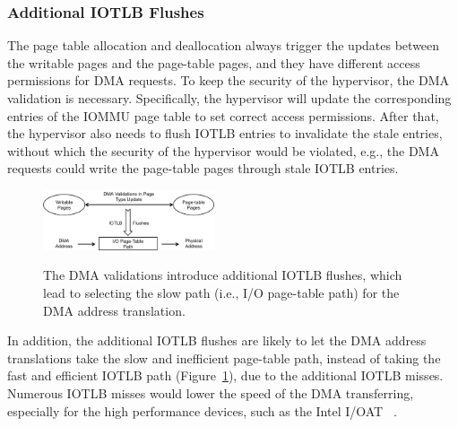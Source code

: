 \subsubsection{Additional IOTLB Flushes}
The page table allocation and deallocation always trigger the updates between the writable pages and the page-table pages, and they have different access permissions for DMA requests.
To keep the security of the hypervisor, the DMA validation is necessary.
Specifically, the hypervisor will update the corresponding entries of the IOMMU page table to set correct access permissions.
After that, the hypervisor also needs to flush IOTLB entries to invalidate the stale entries, without which the security of the hypervisor would be violated, e.g., the DMA requests could write the page-table pages through stale IOTLB entries.

\begin{figure}[ht]
\centering
\includegraphics[width=0.45\textwidth]{image/background/problem-illustration.png} \\
\caption{The DMA validations introduce additional IOTLB flushes, which lead to selecting the slow path  (i.e., I/O page-table path) for the DMA address translation.}
\label{fig:pro-ill}
\end{figure}


In addition, the additional IOTLB flushes are likely to let the DMA address
translations take the slow and inefficient page-table path,
instead of taking the fast and efficient IOTLB path (Figure~\ref{fig:pro-ill}), due to the additional IOTLB misses.
Numerous IOTLB misses would lower the speed of the DMA transferring, especially for the high performance devices, such as the Intel I/OAT ~\cite{lauritzenintel}.





